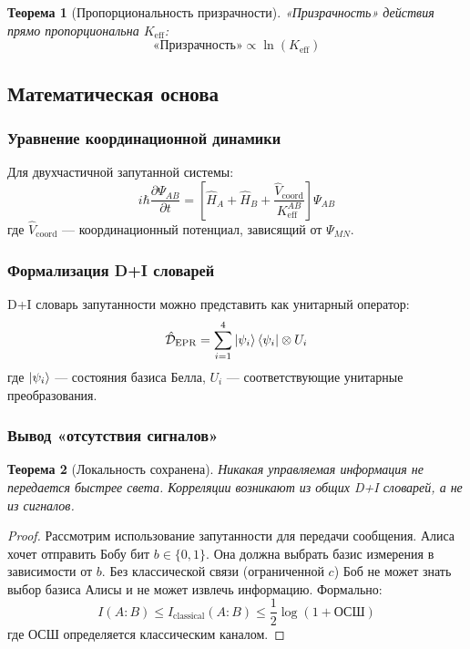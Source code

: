 \documentclass[11pt,a4paper]{article}
\newtheorem{theorem}{Теорема}
\begin{document}
	\begin{theorem}[Пропорциональность призрачности]
		«Призрачность» действия прямо пропорциональна $K_{\mathrm{eff}}$:
		\begin{equation}
			\text{«Призрачность»} \propto \ln(K_{\mathrm{eff}})
		\end{equation}
	\end{theorem}
	
	\subsection{Математическая основа}
	\label{subsec:math-foundation}
	
	\subsubsection{Уравнение координационной динамики}
	Для двухчастичной запутанной системы:
	\begin{equation}
		i\hbar \frac{\partial \Psi_{AB}}{\partial t} = \left[ \hat{H}_A + \hat{H}_B + \frac{\hat{V}_{\text{coord}}}{K_{\mathrm{eff}}^{AB}} \right] \Psi_{AB}
	\end{equation}
	где $\hat{V}_{\text{coord}}$ — координационный потенциал, зависящий от $\Psi_{MN}$.
	
	\subsubsection{Формализация D+I словарей}
	D+I словарь запутанности можно представить как унитарный оператор:
	\begin{equation}
		\hat{\mathcal{D}}_{\text{EPR}} = \sum_{i=1}^{4} \ket{\psi_i}\bra{\psi_i} \otimes U_i
	\end{equation}
	где $\ket{\psi_i}$ — состояния базиса Белла, $U_i$ — соответствующие унитарные преобразования.
	
	\subsubsection{Вывод «отсутствия сигналов»}
	\begin{theorem}[Локальность сохранена]
		Никакая управляемая информация не передается быстрее света. Корреляции возникают из общих D+I словарей, а не из сигналов.
	\end{theorem}
	
	\begin{proof}
		Рассмотрим использование запутанности для передачи сообщения. Алиса хочет отправить Бобу бит $b \in \{0,1\}$. Она должна выбрать базис измерения в зависимости от $b$. Без классической связи (ограниченной $c$) Боб не может знать выбор базиса Алисы и не может извлечь информацию. Формально:
		\begin{equation}
			I(A:B) \leq I_{\text{classical}}(A:B) \leq \frac{1}{2} \log(1 + \text{ОСШ})
		\end{equation}
		где ОСШ определяется классическим каналом.
	\end{proof}
	
\end{document}
